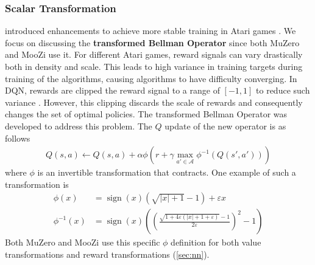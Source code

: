 \subsubsection{Scalar Transformation} \label{sec:scalar_transform}
\citeauthor{ObserveLookFurther_Pohlen.Piot.ea_2018} introduced enhancements to achieve more stable training in Atari games \cite{ObserveLookFurther_Pohlen.Piot.ea_2018}.
We focus on discussing the \textbf{transformed Bellman Operator} since both MuZero and MooZi use it.
For different Atari games, reward signals can vary drastically both in density and scale.
This leads to high variance in training targets during training of the algorithms, causing algorithms to have difficulty converging.
In DQN, rewards are clipped the reward signal to a range of $[-1, 1]$ to reduce such variance \cite{PlayingAtariDeep_Mnih.Kavukcuoglu.ea_2013}.
However, this clipping discards the scale of rewards and consequently changes the set of optimal policies.
The transformed Bellman Operator was developed to address this problem.
The $Q$ update of the new operator is as follows
\begin{align*}
    Q(s, a) \leftarrow Q(s, a) + \alpha \phi \left(r +\gamma \max _{a' \in \mathcal{A}} \phi^{-1}\left(Q\left(s', a'\right)\right)\right)
\end{align*}
where $\phi$ is an invertible transformation that contracts.
One example of such a transformation is
\begin{align*}
    \phi(x)       & = \operatorname{sign}(x)\left(\sqrt{|x|+1}-1\right)+\varepsilon x  \\
    \phi^{-1}(x)  & = \operatorname{sign}(x)\left(\left(\frac{\sqrt{1+4 \varepsilon(|x|+1+\varepsilon)}-1}{2 \varepsilon}\right)^{2}-1\right)
\end{align*}
Both MuZero and MooZi use this specific $\phi$ definition for both value transformations and reward transformations (\ref{sec:nn}).


